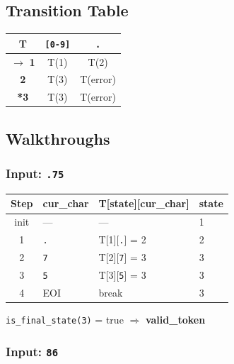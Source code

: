 \documentclass[a4paper,12pt]{article}
\begin{document}
\subsection{Transition Table}

\begin{center}
\renewcommand{\arraystretch}{1.5}
\begin{tabular}{c|cc}
\toprule
\textbf{T} & \texttt{[0-9]} & \texttt{.} \\
\midrule
$\to$ \textbf{1} & T(1)  & T(2)  \\
\textbf{2}        & T(3)  & T(error) \\
\textbf{*3}       & T(3)  & T(error) \\
\bottomrule
\end{tabular}
\end{center}

\subsection{Walkthroughs}

\subsubsection*{Input: \texttt{.75}}

\begin{center}
\renewcommand{\arraystretch}{1.2}
\begin{tabular}{c|l|l|l}
\toprule
\textbf{Step} & \textbf{cur\_char} & \textbf{T[state][cur\_char]} & \textbf{state} \\
\midrule
init  & ---           & ---              & 1 \\
1     & \texttt{.}    & T[1][\texttt{.}] = 2     & 2 \\
2     & \texttt{7}    & T[2][\texttt{7}] = 3     & 3 \\
3     & \texttt{5}    & T[3][\texttt{5}] = 3     & 3 \\
4     & EOI           & break            & 3 \\
\bottomrule
\end{tabular}
\end{center}
\texttt{is\_final\_state(3)} = true $\Rightarrow$ \textbf{valid\_token}

\subsubsection*{Input: \texttt{86}}
\end{document}
